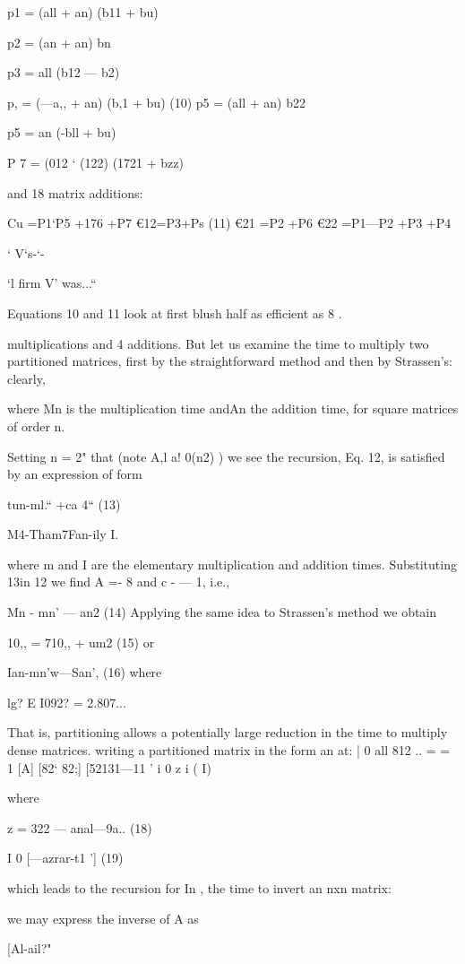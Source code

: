 {{{{{{{{{{{{{{{{{{{{p1 = (all + an) (b11 + bu)

p2 = (an + an) bn

p3 = all (b12 — b2)

p, = (—a,, + an) (b,1 + bu) (10)
p5 = (all + an) b22

p5 = an (-bll + bu)

P 7 = (012 ‘ (122) (1721 + bzz)

and 18 matrix additions:

Cu =P1‘P5 +176 +P7
€12=P3+Ps
(11)
€21 =P2 +P6
€22 =P1—P2 +P3 +P4

‘ V‘s-‘-

‘l firm V' was...“

Equations 10 and 11 look at first blush half as efficient as 8 .

multiplications and 4 additions. But let us examine the time to
multiply two partitioned matrices, first by the straightforward
method and then by Strassen's: clearly,

where Mn is the multiplication time andAn the addition time, for
square matrices of order n.

Setting n = 2" that (note A,l a! 0(n2) ) we see the recursion,
Eq. 12, is satisfied by an expression of form

tun-ml.“ +ca 4“ (13)

M4-Tham7Fan-ily I.

where m and I are the elementary multiplication and addition
times. Substituting 13in 12 we find A =- 8 and c - — 1, i.e.,

Mn - mn’ — an2 (14)
Applying the same idea to Strassen’s method we obtain

10,, = 710,, + um2 (15)
or

Ian-mn’w—San’, (16)
where

lg? E I092? = 2.807...

That is, partitioning allows a potentially large reduction in the
time to multiply dense matrices.
 writing a partitioned matrix in the form
an at: | 0 all 812 ..
= = 1
[A] [82‘ 82;] [52131—11 ' i 0 z i ( I)

where

 

z = 322 — anal—9a.. (18)

I 0
[—azrar-t1 '] (19)

which leads to the recursion for In , the time to invert an nxn
matrix:

we may express the inverse of A as

[Al-ail?"

}}}}}}}}}}}}}}}}}}}}
